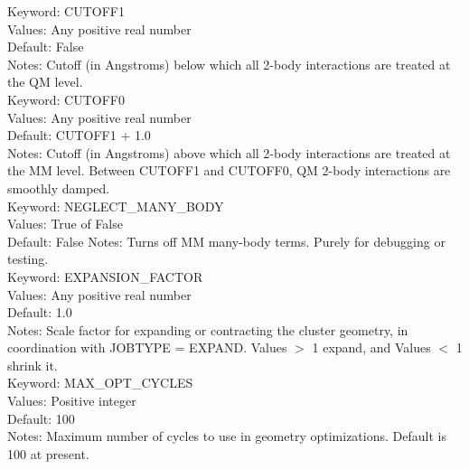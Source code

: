 \documentclass[11pt,letterpaper]{article}
\begin{document}
\begin{spacing}{1.0}
\noindent
Keyword: CUTOFF1 \\
Values:  Any positive real number \\
Default: False \\
Notes:   Cutoff (in Angstroms) below which all 2-body interactions are treated 
	 at the QM level. \\

\noindent
Keyword: CUTOFF0 \\
Values:  Any positive real number \\
Default: CUTOFF1 + 1.0  \\
Notes:   Cutoff (in Angstroms) above which all 2-body interactions are treated 
	 at the MM level.  Between CUTOFF1 and CUTOFF0, QM 2-body interactions 
	 are smoothly damped. \\
 
\noindent 
Keyword: NEGLECT\_MANY\_BODY \\
Values:  True of False \\
Default: False
Notes:   Turns off MM many-body terms.  Purely for debugging or testing. \\


\noindent
Keyword: EXPANSION\_FACTOR \\
Values:  Any positive real number \\
Default: 1.0 \\
Notes:   Scale factor for expanding or contracting the cluster geometry,
	 in coordination with JOBTYPE = EXPAND.  Values $>$ 1 expand, and 
	 Values $<$ 1 shrink it. \\

\noindent
Keyword: MAX\_OPT\_CYCLES \\
Values:  Positive integer \\
Default: 100 \\
Notes:   Maximum number of cycles to use in geometry optimizations.  
         Default is 100 at present.  





\end{spacing}
\end{document}
